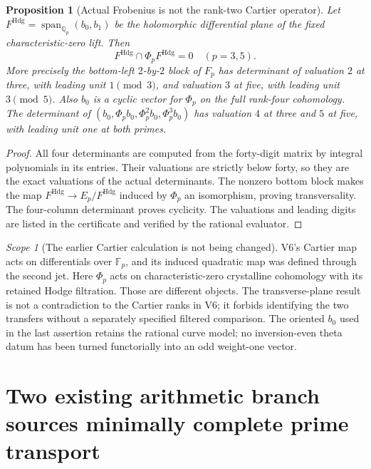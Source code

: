 \documentclass[11pt]{article}
\newtheorem{proposition}[proposition]{Proposition}
\theoremstyle{definition}
\theoremstyle{remark}
\newtheorem{scope}[scope]{Scope}
\newcommand{\F}{\mathbb F}
\newcommand{\Q}{\mathbb Q}
\newcommand{\Span}{\operatorname{span}}
\begin{document}
\begin{proposition}[Actual Frobenius is not the rank-two Cartier operator]
\label{prop:v11-hodge}
Let $F^{\mathrm{Hdg}}=\Span_{\Q_p}(b_0,b_1)$ be the holomorphic
differential plane of the fixed characteristic-zero lift. Then
\begin{equation}
 \boxed{F^{\mathrm{Hdg}}\cap\Phi_p F^{\mathrm{Hdg}}=0
 \quad(p=3,5).}
 \label{eq:v11-hodge-transverse}
\end{equation}
More precisely the bottom-left $2$-by-$2$ block of $F_p$ has determinant
of valuation $2$ at three, with leading unit $1\pmod3$, and valuation
$3$ at five, with leading unit $3\pmod5$.
Also $b_0$ is a cyclic vector for $\Phi_p$ on the full rank-four
cohomology. The determinant of
$(b_0,\Phi_pb_0,\Phi_p^2b_0,\Phi_p^3b_0)$ has valuation $4$ at
three and $5$ at five, with leading unit one at both primes.
\end{proposition}
\begin{proof}
All four determinants are computed from the forty-digit matrix by integral
polynomials in its entries. Their valuations are strictly below forty,
so they are the exact valuations of the actual determinants. The
nonzero bottom block makes the map
$F^{\mathrm{Hdg}}\to E_p/F^{\mathrm{Hdg}}$ induced by $\Phi_p$
an isomorphism, proving transversality. The four-column determinant
proves cyclicity. The valuations and leading digits are listed in the
certificate and verified by the rational evaluator.
\end{proof}

\begin{scope}[The earlier Cartier calculation is not being changed]
V6's Cartier map acts on differentials over $\F_p$, and its induced
quadratic map was defined through the second jet. Here $\Phi_p$ acts on
characteristic-zero crystalline cohomology with its retained Hodge
filtration. Those are different objects. The transverse-plane result is
not a contradiction to the Cartier ranks in V6; it forbids identifying
the two transfers without a separately specified filtered comparison.
The oriented $b_0$ used in the last assertion retains the rational curve
model; no inversion-even theta datum has been turned functorially into
an odd weight-one vector.
\end{scope}

\section{Two existing arithmetic branch sources minimally complete prime transport}
\label{sec:v11-cyclic}
\end{document}
